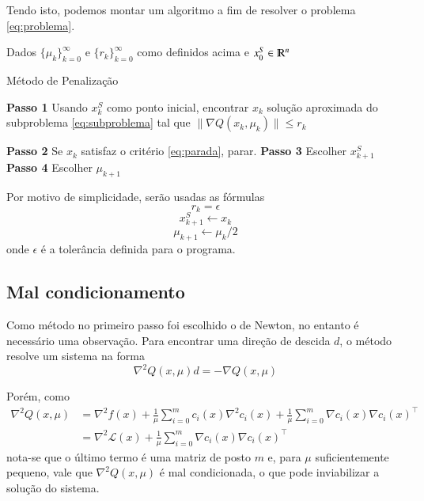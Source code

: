 Tendo isto, podemos montar um algoritmo a fim de resolver o problema \ref{eq:problema}.

Dados $\{\mu_k\}_{k = 0}^\infty$ e $\{r_k\}_{k = 0}^\infty$ como definidos acima
e $x_0^S \in \varmathbb{R}^n$
\begin{algorithm}[h]
    \caption{Método de Penalização}
    \label{alg:penalizacao}
    \begin{algorithmic}
            \State \textbf{Passo 1} Usando $x_k^S$ como ponto inicial, encontrar $x_k$ solução
                   aproximada do subproblema \ref{eq:subproblema}
                   tal que $\| \nabla Q(x_k, \mu_k) \| \leq r_k$

            \State \textbf{Passo 2} Se $x_k$ satisfaz o critério \ref{eq:parada}, parar.
            \State \textbf{Passo 3} Escolher $x_{k+1}^S$
            \State \textbf{Passo 4} Escolher $\mu_{k+1}$
        \EndFor
    \end{algorithmic}
\end{algorithm}

Por motivo de simplicidade, serão usadas as fórmulas
$$ r_k = \epsilon$$
$$ x_{k+1}^S \gets x_k$$
$$ \mu_{k+1} \gets \mu_k/2$$
onde $\epsilon$ é a tolerância definida para o programa.

\subsection{Mal condicionamento}
    Como método no primeiro passo foi escolhido o de Newton, no entanto é necessário
    uma observação. Para encontrar uma direção de descida $d$, o método resolve um sistema
    na forma
    $$ \nabla^2 Q(x, \mu) d = -\nabla Q(x, \mu) $$

    Porém, como
    \begin{equation}
        \begin{aligned}
            \nabla^2 Q(x, \mu) &= \nabla^2 f(x) + \frac{1}{\mu}\sum_{i = 0}^m c_i(x)\nabla^2 c_i(x) + \frac{1}{\mu}\sum_{i = 0}^m \nabla c_i(x)\nabla c_i(x)^\top \\
                               &= \nabla^2 \mathcal{L}(x) + \frac{1}{\mu}\sum_{i = 0}^m \nabla c_i(x)\nabla c_i(x)^\top
        \end{aligned}
    \end{equation}
    nota-se que o último termo é uma matriz de posto $m$ e, para $\mu$ suficientemente
    pequeno, vale que $\nabla^2 Q(x, \mu)$ é mal condicionada, o que pode inviabilizar
    a solução do sistema.

